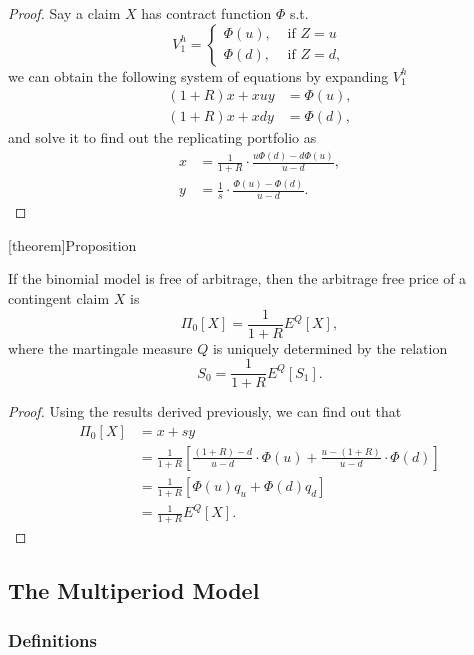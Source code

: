 \documentclass[twocolumn,landscape,10pt]{article}
\theoremstyle{definition}
\begin{document}
\begin{proof}
    Say a claim $X$ has contract function $\Phi$ s.t. \[
        V_1^h=
        \begin{cases}
            \Phi(u), & \text{ if $Z=u$}\\
            \Phi(d), & \text{ if $Z=d$},
        \end{cases}
    \]
    we can obtain the following system of equations by expanding $V_1^h$
    \begin{align*}
        (1+R)x+xuy&=\Phi(u),\\
        (1+R)x+xdy&=\Phi(d),
    \end{align*}
    and solve it to find out the replicating portfolio as
    \begin{align*}
        x&=\frac{1}{1+R}\cdot \frac{u\Phi(d)-d\Phi(u)}{u-d},\\
        y&=\frac{1}{s}\cdot \frac{\Phi(u)-\Phi(d)}{u-d}.
    \end{align*}
\end{proof}

[theorem]{Proposition}
\begin{claim pricing prop}
    If the binomial model is free of arbitrage, then the arbitrage free price of
    a contingent claim $X$ is
    \[
        \Pi_0[X]=\frac{1}{1+R}E^Q[X],
    \]
    where the martingale measure $Q$ is uniquely determined by the relation
    \[
        S_0=\frac{1}{1+R}E^Q[S_1].
    \]
\end{claim pricing prop}

\begin{proof}
    Using the results derived previously, we can find out that
    \begin{align*}
        \Pi_0[X]
        &= x + sy \\
        &= \frac{1}{1+R}\left[\frac{(1+R)-d}{u-d}\cdot
        \Phi(u)+\frac{u-(1+R)}{u-d}\cdot \Phi(d)\right]\\
        &= \frac{1}{1+R}\left[\Phi(u)q_u+\Phi(d)q_d\right]\\
        &= \frac{1}{1+R}E^Q[X].
    \end{align*}
\end{proof}

\subsection{The Multiperiod Model}

\subsubsection{Definitions}
\end{document}
